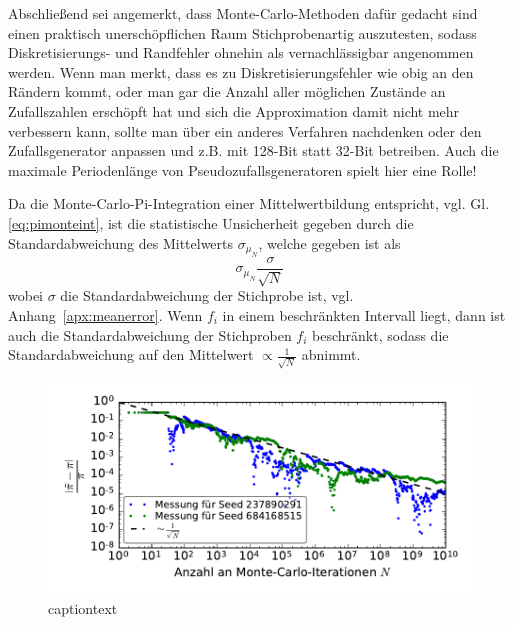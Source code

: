 Abschließend sei angemerkt, dass Monte-Carlo-Methoden dafür gedacht sind einen praktisch unerschöpflichen Raum Stichprobenartig auszutesten, sodass Diskretisierungs- und Randfehler ohnehin als vernachlässigbar angenommen werden. Wenn man merkt, dass es zu Diskretisierungsfehler wie obig an den Rändern kommt, oder man gar die Anzahl aller möglichen Zustände an Zufallszahlen erschöpft hat und sich die Approximation damit nicht mehr verbessern kann, sollte man über ein anderes Verfahren nachdenken oder den Zufallsgenerator anpassen und z.B. mit 128-Bit statt 32-Bit betreiben. Auch die maximale Periodenlänge von Pseudozufallsgeneratoren spielt hier eine Rolle!
%

Da die Monte-Carlo-Pi-Integration einer Mittelwertbildung entspricht, vgl. Gl.\ref{eq:pimonteint}, ist die statistische Unsicherheit gegeben durch die Standardabweichung des Mittelwerts $\sigma_{\mu_N}$, welche gegeben ist als
\begin{equation}
	\sigma_{\mu_N} \frac{\sigma}{\sqrt{N}}
\end{equation}
wobei $\sigma$ die Standardabweichung der Stichprobe ist, vgl. Anhang~\ref{apx:meanerror}.
Wenn $f_i$ in einem beschränkten Intervall liegt, dann ist auch die Standardabweichung der Stichproben $f_i$ beschränkt, sodass die Standardabweichung auf den Mittelwert $\propto \frac{1}{\sqrt{N}}$ abnimmt.

\begin{figure}
	\centering
	\begin{minipage}{0.7\linewidth}
		\includegraphics[width=\linewidth]{monte-carlo-pi-error-scaling}
	\end{minipage}
	\caption{captiontext}
	\label{fig:monteerrorfloat}
\end{figure}


